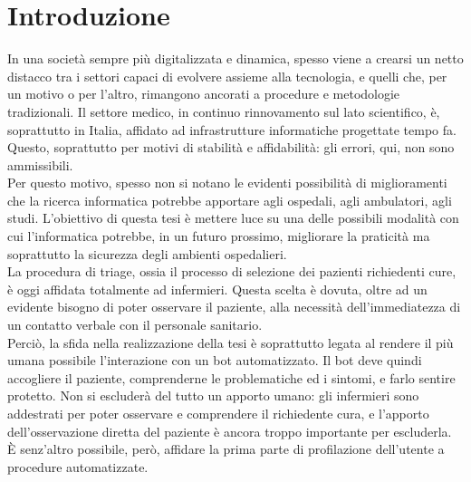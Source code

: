 \chapter{Introduzione}
\label{chap:introduzione}
In una società sempre più digitalizzata e dinamica, spesso viene a crearsi un netto distacco tra i settori capaci di evolvere assieme alla tecnologia, e quelli che, per un motivo o per l'altro, rimangono ancorati a procedure e metodologie tradizionali. Il settore medico, in continuo rinnovamento sul lato scientifico, è, soprattutto in Italia, affidato ad infrastrutture informatiche progettate tempo fa. Questo, soprattutto per motivi di stabilità e affidabilità: gli errori, qui, non sono ammissibili. \\
Per questo motivo, spesso non si notano le evidenti possibilità di miglioramenti che la ricerca informatica potrebbe apportare agli ospedali, agli ambulatori, agli studi.
L'obiettivo di questa tesi è mettere luce su una delle possibili modalità con cui l'informatica potrebbe, in un futuro prossimo, migliorare la praticità ma soprattutto la sicurezza degli ambienti ospedalieri.\\
La procedura di triage, ossia il processo di selezione dei pazienti richiedenti cure, è oggi affidata totalmente ad infermieri. Questa scelta è dovuta, oltre ad un evidente bisogno di poter osservare il paziente, alla necessità dell'immediatezza di un contatto verbale con il personale sanitario. \\
Perciò, la sfida nella realizzazione della tesi è soprattutto legata al rendere il più umana possibile l'interazione con un bot automatizzato. Il bot deve quindi accogliere il paziente, comprenderne le problematiche ed i sintomi, e farlo sentire protetto. Non si escluderà del tutto un apporto umano: gli infermieri sono addestrati per poter osservare e comprendere il richiedente cura, e l'apporto dell'osservazione diretta del paziente è ancora troppo importante per escluderla. È senz'altro possibile, però, affidare la prima parte di profilazione dell'utente a procedure automatizzate.
